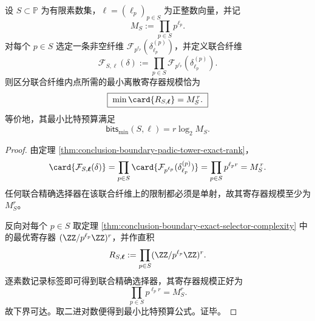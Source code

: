 \begin{theorem}[有限素数联合读出的精确选择器乘法律]\label{thm:conclusion-boundary-finite-prime-selector-product-law}
设 \(S\subset \mathbb P\) 为有限素数集，\(\boldsymbol\ell=(\ell_p)_{p\in S}\) 为正整数向量，并记
\[
M_S:=\prod_{p\in S}p^{\ell_p}.
\]
对每个 \(p\in S\) 选定一条非空纤维 \(\mathcal F_{p^{\ell_p}}(\delta_{\ell_p}^{(p)})\)，并定义联合纤维
\[
\mathcal F_{S,\boldsymbol\ell}(\delta)
:=
\prod_{p\in S}\mathcal F_{p^{\ell_p}}(\delta_{\ell_p}^{(p)}).
\]
则区分联合纤维内点所需的最小离散寄存器规模恰为
\[
\boxed{\;
\min \card{R_{S,\boldsymbol\ell}}=M_S^{\,r}.
\;}
\]
等价地，其最小比特预算满足
\[
\boxed{\;
\mathsf{bits}_{\min}(S,\boldsymbol\ell)=r\log_2 M_S.
\;}
\]
\end{theorem}
\begin{proof}
由定理 \ref{thm:conclusion-boundary-padic-tower-exact-rank}，
\[
\card{\mathcal F_{S,\boldsymbol\ell}(\delta)}
=
\prod_{p\in S}\card{\mathcal F_{p^{\ell_p}}(\delta_{\ell_p}^{(p)})}
=
\prod_{p\in S}p^{\ell_p r}
=
M_S^{\,r}.
\]
任何联合精确选择器在该联合纤维上的限制都必须是单射，故其寄存器规模至少为 \(M_S^r\)。

反向对每个 \(p\in S\) 取定理 \ref{thm:conclusion-boundary-exact-selector-complexity} 中的最优寄存器
\(
(\ZZ/p^{\ell_p}\ZZ)^r
\)，并作直积
\[
R_{S,\boldsymbol\ell}
:=
\prod_{p\in S}(\ZZ/p^{\ell_p}\ZZ)^r.
\]
逐素数记录标签即可得到联合精确选择器，其寄存器规模正好为
\[
\prod_{p\in S}p^{\ell_p r}=M_S^r.
\]
故下界可达。取二进对数便得到最小比特预算公式。证毕。
\end{proof}

